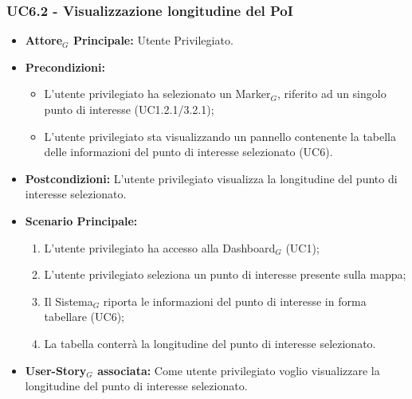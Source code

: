 \documentclass[10pt]{article}
\begin{document}
\begin{justify}
 \subsubsection{\textbf{UC6.2 - Visualizzazione longitudine del PoI}}
 \begin{itemize}
     \item \textbf{Attore$_G$ Principale:} Utente Privilegiato.
     \item \textbf{Precondizioni:}
       \begin{itemize}
    	        \item L'utente privilegiato ha selezionato un Marker$_G$, riferito ad un singolo punto di interesse (UC1.2.1/3.2.1);
          \item L'utente privilegiato sta visualizzando un pannello contenente la tabella delle informazioni del punto di interesse selezionato (UC6).
       \end{itemize}
     \item \textbf{Postcondizioni:} L'utente privilegiato visualizza la longitudine del punto di interesse selezionato.
     \item \textbf{Scenario Principale:}
        \begin{enumerate}
            \item L'utente privilegiato ha accesso alla Dashboard$_G$ (UC1);
            \item L'utente privilegiato seleziona un punto di interesse presente sulla mappa;
            \item Il Sistema$_G$ riporta le informazioni del punto di interesse in forma tabellare (UC6);
            \item La tabella conterrà la longitudine del punto di interesse selezionato.
        \end{enumerate}
     \item \textbf{User-Story$_G$ associata:} Come utente privilegiato voglio visualizzare la longitudine del punto di interesse selezionato. 
 \end{itemize}

\end{justify}
\end{document}
